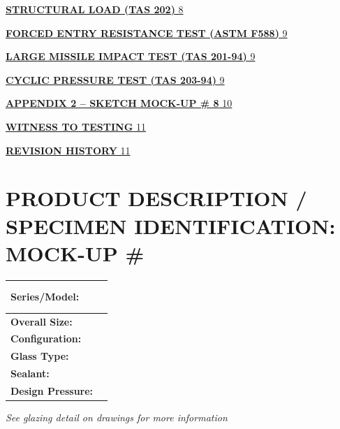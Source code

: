 \protect\hyperlink{structural-load-tas-202-1}{\textbf{STRUCTURAL LOAD
(TAS 202)} 8}

\protect\hyperlink{forced-entry-resistance-test-astm-f588-1}{\textbf{FORCED
ENTRY RESISTANCE TEST (ASTM F588)} 9}

\protect\hyperlink{large-missile-impact-test-tas-201-94-1}{\textbf{LARGE
MISSILE IMPACT TEST (TAS 201-94)} 9}

\protect\hyperlink{cyclic-pressure-test-tas-203-94-1}{\textbf{CYCLIC
PRESSURE TEST (TAS 203-94)} 9}

\protect\hyperlink{appendix-2-sketch-mock-up}{\textbf{APPENDIX 2 --
SKETCH MOCK-UP \# 8} 10}

\protect\hyperlink{witness-to-testing}{\textbf{WITNESS TO TESTING} 11}

\protect\hyperlink{revision-history}{\textbf{REVISION HISTORY} 11}

\hypertarget{product-description-specimen-identification-mock-up}{%
\section{\texorpdfstring{\textbf{PRODUCT DESCRIPTION / SPECIMEN
IDENTIFICATION: MOCK-UP \#}
}{PRODUCT DESCRIPTION / SPECIMEN IDENTIFICATION: MOCK-UP \# }}\label{product-description-specimen-identification-mock-up}}

\begin{longtable}[]{@{}ll@{}}
\toprule
\begin{minipage}[b]{0.47\columnwidth}\raggedright
\textbf{Series/Model:}\strut
\end{minipage} & \begin{minipage}[b]{0.47\columnwidth}\raggedright
\hypertarget{section}{%
\section{}\label{section}}\strut
\end{minipage}\tabularnewline
\midrule
\endhead
\textbf{Overall Size:} &\tabularnewline
\textbf{Configuration:} &\tabularnewline
\textbf{Glass Type:} &\tabularnewline
\textbf{Sealant:} &\tabularnewline
\textbf{Design Pressure:} &\tabularnewline
\bottomrule
\end{longtable}

\emph{See glazing detail on drawings for more information}

